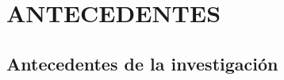 \documentclass[a4paper]{article}
\begin{document}
\begin{table}[ht]
\begin{center}
\begin{tabular}{>{\centering}m{2.4cm} m{2.2cm}m{2.2cm}m{1.8cm}m{2cm}m{1.7cm}m{1.5cm}m{1.6cm} @{}m{0pt}@{} }


\end{tabular}
\hspace*{-1cm}
\end{center}
\end{table}

\section{ANTECEDENTES}\label{antecedentes}

\subsection{Antecedentes de la
investigación}\label{antecedentes-de-la-investigacion}
\end{document}
